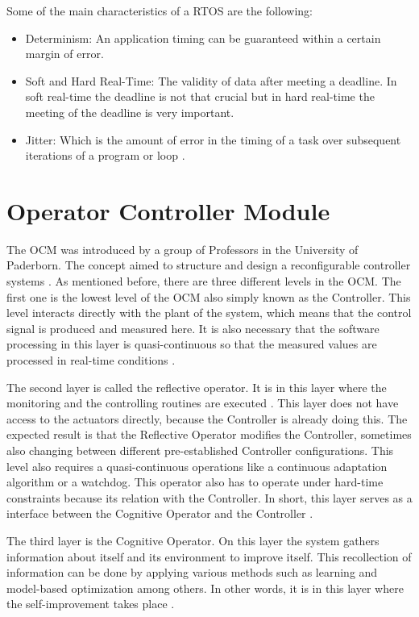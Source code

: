 \documentclass[12pt]{report}%
\begin{document}
Some of the main characteristics of a RTOS are the following:

\begin{itemize}
\item Determinism: An application timing can be guaranteed within a certain margin of error.
\item Soft and Hard Real-Time: The validity of data after meeting a deadline. In soft real-time the deadline is not that crucial but in hard real-time the meeting of the deadline is very important.
\item Jitter: Which is the amount of error in the timing of a task over subsequent iterations of a program or loop \cite{whatisRTOS}.
\end{itemize}

\section{Operator Controller Module}
The OCM was introduced by a group of Professors in the University of Paderborn. The concept aimed to structure and design a reconfigurable controller systems \cite{ocmAuto}. As mentioned before, there are three different levels in the OCM. The first one is the lowest level of the OCM also simply known as the Controller. This level interacts directly with the plant of the system, which means that the control signal is produced and measured here. It is also necessary that the software processing in this layer is quasi-continuous so that the measured values are processed in real-time conditions \cite{ocmAuto}.

The second layer is called the reflective operator. It is in this layer where the monitoring and the controlling routines are executed \cite{ocmAuto}. This layer does not have access to the actuators directly, because the Controller is already doing this. The expected result is that the Reflective Operator modifies the Controller, sometimes also changing between different pre-established Controller configurations. This level also requires a quasi-continuous operations like a continuous adaptation algorithm or a watchdog. This operator also has to operate under hard-time constraints because its relation with the Controller. In short, this layer serves as a interface between the Cognitive Operator and the Controller \cite{ocmAuto}.

The third layer is the Cognitive Operator. On this layer the system gathers information about itself and its environment to improve itself. This recollection of information can be done by applying various methods such as learning and model-based optimization among others. In other words, it is in this layer where the self-improvement takes place \cite{ocmAuto}.
\end{document}
